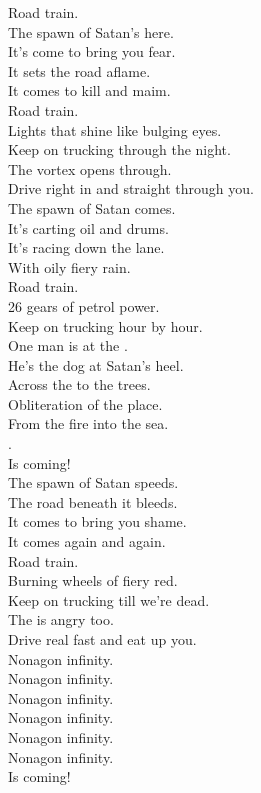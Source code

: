 Road train. \\

The spawn of Satan's here. \\
It's come to bring you fear. \\
It sets the road aflame. \\
It comes to kill and maim. \\

Road train. \\

Lights that shine like bulging eyes. \\
Keep on trucking through the night. \\
The vortex opens through. \\
Drive right in and straight through you. \\

The spawn of Satan comes. \\
It's carting oil and drums. \\
It's racing down the lane. \\
With oily fiery rain. \\

Road train. \\

26 gears of petrol power. \\
Keep on trucking hour by hour. \\
One man is at the . \\
He's the dog at Satan's heel. \\

Across the  to the trees. \\
Obliteration of the place. \\
From the fire into the sea. \\
. \\
Is coming! \\

The spawn of Satan speeds. \\
The road beneath it bleeds. \\
It comes to bring you shame. \\
It comes again and again. \\

Road train. \\

Burning wheels of fiery red. \\
Keep on trucking till we're dead. \\
The  is angry too. \\
Drive real fast and eat up you. \\

Nonagon infinity. \\
Nonagon infinity. \\
Nonagon infinity. \\
Nonagon infinity. \\
Nonagon infinity. \\
Nonagon infinity. \\
Is coming! \\
